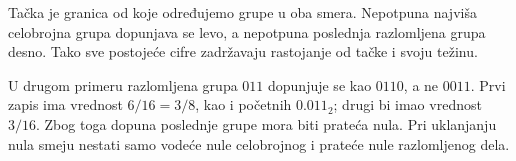 
Tačka je granica od koje određujemo grupe u oba smera. Nepotpuna najviša celobrojna grupa dopunjava se levo, a nepotpuna poslednja razlomljena grupa desno. Tako sve postojeće cifre zadržavaju rastojanje od tačke i svoju težinu.

U drugom primeru razlomljena grupa $011$ dopunjuje se kao $0110$, a ne $0011$. Prvi zapis ima vrednost $6/16=3/8$, kao i početnih $0.011_2$; drugi bi imao vrednost $3/16$. Zbog toga dopuna poslednje grupe mora biti prateća nula. Pri uklanjanju nula smeju nestati samo vodeće nule celobrojnog i prateće nule razlomljenog dela.
